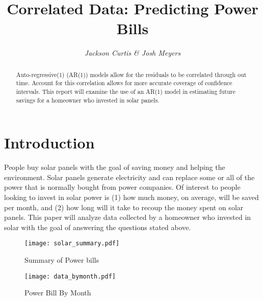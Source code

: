 \documentclass{svproc}
\begin{document}
\mainmatter              
\title{Correlated Data: Predicting Power Bills}






\author{\emph{Jackson Curtis \& Josh Meyers}}


\maketitle           


\begin{abstract}
Auto-regressive(1) (AR(1)) models allow for the residuals to be correlated through out time. Account for this correlation allows for more accurate coverage of confidence intervals. This report will examine the use of an AR(1) model in estimating future savings for a homeowner who invested in solar panels. 
\end{abstract}


\section{Introduction}
People buy solar panels with the goal of saving money and helping the environment. Solar panels generate electricity and can replace some or all of the power that is normally bought from power companies. Of interest to people looking to invest in solar power is (1) how much money, on average, will be saved per month, and (2) how long will it take to recoup the money spent on solar panels. This paper will analyze data collected by a homeowner who invested in solar with the goal of answering the questions stated above. 


\begin{figure}[h] %
\begin{minipage}[t]{.45\linewidth}
\texttt{[image: solar\_summary.pdf]}
\caption{ Summary of Power bills}
\label{fig:billsummary}
\end{minipage}\hfill
\begin{minipage}[t]{.45\linewidth}
\texttt{[image: data\_bymonth.pdf]}
\caption{Power Bill By Month}
\label{fig:billbymonth}
\end{minipage}
\end{figure}
\end{document}

